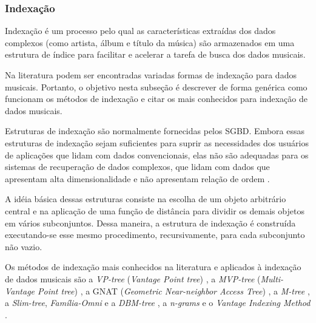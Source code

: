 \subsubsection{Indexação}
Indexação é um processo pelo qual as características extraídas dos dados complexos (como artista, álbum e título da música) são armazenados em uma estrutura de índice para facilitar e acelerar a tarefa de busca dos dados musicais.

Na literatura podem ser encontradas variadas formas de indexação para dados musicais. Portanto, o objetivo nesta subseção é descrever de forma genérica como funcionam os métodos de indexação e citar os mais conhecidos para indexação de dados musicais.

Estruturas de indexação são normalmente fornecidas pelos SGBD. Embora essas estruturas de indexação sejam suficientes para suprir as necessidades dos usuários de aplicações que lidam com dados convencionais, elas não são adequadas para os sistemas de recuperação de dados complexos, que lidam com dados que apresentam alta dimensionalidade e não apresentam relação de ordem \cite{barioni2006}.

A idéia básica dessas estruturas consiste na escolha de um objeto arbitrário central e na aplicação de uma função de distância para dividir os demais objetos em vários subconjuntos. Dessa maneira, a estrutura de indexação é construída executando-se esse mesmo procedimento, recursivamente, para cada subconjunto não vazio.

Os métodos de indexação mais conhecidos na literatura e aplicados à indexação de dados musicais são a \textit{VP-tree} (\textit{Vantage Point tree}) \cite{yanilos1993}, a \textit{MVP-tree} (\textit{Multi-Vantage Point tree}) \cite{bozkaya1997}, a GNAT (\textit{Geometric Near-neighbor Access Tree}) \cite{brin1995}, a \textit{M-tree} \cite{ciaccia1997}, a \textit{Slim-tree}, \textit{Família-Omni} e a \textit{DBM-tree} \cite{traina2000, filho2001, vieira2004}, a \textit{n-grams} \cite{downie1999} e o \textit{Vantage Indexing Method} \cite{typke2003}.
